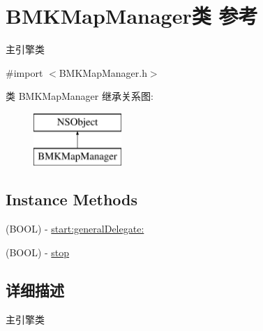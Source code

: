 \hypertarget{interface_b_m_k_map_manager}{\section{B\+M\+K\+Map\+Manager类 参考}
\label{interface_b_m_k_map_manager}
}


主引擎类  




{\ttfamily \#import $<$B\+M\+K\+Map\+Manager.\+h$>$}

类 B\+M\+K\+Map\+Manager 继承关系图\+:\begin{figure}[H]
\begin{center}
\leavevmode
\includegraphics[height=2.000000cm]{interface_b_m_k_map_manager}
\end{center}
\end{figure}
\subsection*{Instance Methods}
\begin{DoxyCompactItemize}
\item 
(B\+O\+O\+L) -\/ \hyperlink{interface_b_m_k_map_manager_a95edf9c8fea4c61a79098641c4e9a50f}{start\+:general\+Delegate\+:}
\item 
(B\+O\+O\+L) -\/ \hyperlink{interface_b_m_k_map_manager_ac53850202f5017ff35c8933c171be0f1}{stop}
\end{DoxyCompactItemize}


\subsection{详细描述}
主引擎类 

